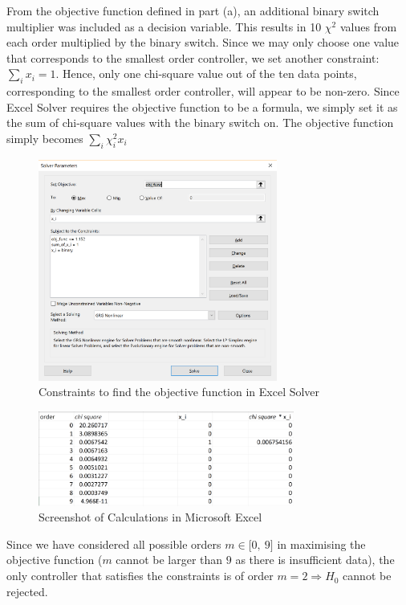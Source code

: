 \documentclass[12pt,a4paper]{article}
\begin{document}
	From the objective function defined in part (a), an additional binary switch multiplier was included as a decision variable. This results in 10 $\chi^2$ values from each order multiplied by the binary switch. Since we may only choose one value that corresponds to the smallest order controller, we set another constraint: $\sum_i x_i = 1$. Hence, only one chi-square value out of the ten data points, corresponding to the smallest order controller, will appear to be non-zero. Since Excel Solver requires the objective function to be a formula, we simply set it as the sum of chi-square values with the binary switch on. The objective function simply becomes $\sum_{i} \chi^2_i x_i$
	\begin{figure}[H]
		\begin{center}
			\includegraphics[width=0.7\textwidth]{constraints.png}
			\caption{Constraints to find the objective function in Excel Solver}
			\label{fig:constraints}
		\end{center}
	\end{figure}
    \begin{figure}[H]
    	\begin{center}
    		\includegraphics[width=0.75\textwidth]{xcel.png}
    		\caption{Screenshot of Calculations in Microsoft Excel}
    		\label{fig:xcel}
    	\end{center}
    \end{figure}
    Since we have considered all possible orders $m \in \lbrack 0, \ 9 \rbrack$ in maximising the objective function ($m$ cannot be larger than $9$ as there is insufficient data), the only controller that satisfies the constraints is of order $m = 2 \Rightarrow H_0$ cannot be rejected.
	
\end{document}

